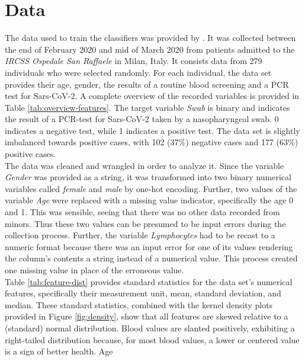 \label{chap:methods}
\section{Data}
The data used to train the classifiers was provided by 
\citeauthor{RN127} \cite{RN127}. 
It was collected between the end of February 2020 and mid of March 2020 from 
patients admitted to the \textit{IRCSS Ospedale San Raffaele} in Milan, 
Italy. It consists data from 279 individuals who were selected randomly.
For each individual, the data set provides their age, gender, the results of a 
routine blood screening and a PCR test for Sars-CoV-2.
A complete overview of the recorded variables is provided in Table 
\ref{tab:overview-features}. The target variable \textit{Swab} is binary and 
indicates the result of a PCR-test for Sars-CoV-2 taken by a nasopharyngeal 
swab. 0 indicates a negative test, while 1 indicates a positive test.
The data set is slightly imbalanced towards positive cases, with 102 (37\%) 
negative cases and 177 (63\%) positive cases.
\\
The data was cleaned and wrangled in order to analyze it.
Since the variable \textit{Gender} 
was provided as a string, it was transformed into two binary numerical 
variables called \textit{female} and \textit{male} by one-hot encoding.
Further, two values of the variable \textit{Age} were replaced with a missing 
value indicator, specifically 
the age 0 and 1. This was sensible, seeing that there was no other 
data recorded from minors. Thus these two values can 
be presumed to be input errors during the collection process.
Further, the variable \textit{Lymphocytes} had to be recast to a numeric 
format because there was an input error for one of its 
values rendering the column's contents a string instead of a numerical 
value. This process created one missing value in place of the erroneous value.
\\
Table \ref{tab:feature-dist} provides standard statistics for the data set's 
numerical features, specifically their measurement unit, mean, standard 
deviation, and median.
These standard statistics, combined with the kernel density plots 
provided in Figure \ref{fig:density}, show that all features are skewed 
relative to a (standard) normal distribution. Blood values are 
slanted positively, exhibiting a right-tailed distribution because, for most 
blood values, a lower or centered value is a sign of better health. Age 
